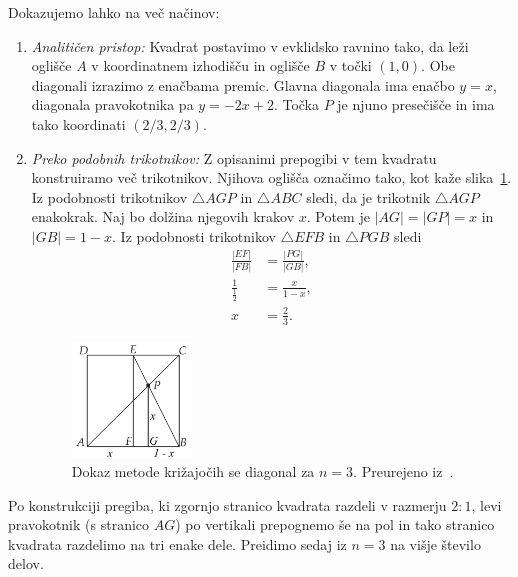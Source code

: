 \begin{dokaz}
    Dokazujemo lahko na več načinov:
    \begin{enumerate}
        \item \textit{Analitičen pristop:} Kvadrat postavimo v evklidsko ravnino tako, da leži oglišče $A$ v koordinatnem izhodišču in oglišče $B$ v točki $(1, 0)$. Obe diagonali izrazimo z enačbama premic. Glavna diagonala ima enačbo $y = x$, diagonala pravokotnika pa $y = -2x + 2$. Točka $P$ je njuno presečišče in ima tako koordinati $(2/3, 2/3)$.
        \item \textit{Preko podobnih trikotnikov:} Z opisanimi prepogibi v tem kvadratu konstruiramo več trikotnikov. Njihova oglišča označimo tako, kot kaže slika~\ref{fig:kriz_diag_3_dokaz}. Iz podobnosti trikotnikov $\triangle AGP$ in $\triangle ABC$ sledi, da je trikotnik $\triangle AGP$ enakokrak. Naj bo dolžina njegovih krakov $x$. Potem je $|AG| = |GP| = x$ in $|GB| = 1 - x$. Iz podobnosti trikotnikov $\triangle EFB$ in $\triangle PGB$ sledi
        \begin{align*}
            \frac{|EF|}{|FB|} &= \frac{|PG|}{|GB|}, \\
            \frac{1}{\frac{1}{2}} &= \frac{x}{1 - x}, \\
            x &= \frac{2}{3}.
        \end{align*}
        \begin{figure}[h]
            \centering
            \includegraphics[width=0.3\textwidth]{images/tretjinjenje_stranice2.png}
            \caption[Dokaz metode križajočih diagonal]{Dokaz metode križajočih se diagonal za $n=3$. Preurejeno iz~\cite[str. 38]{hull2013}.}
            \label{fig:kriz_diag_3_dokaz}
        \end{figure}
    \end{enumerate}
\end{dokaz}

Po konstrukciji pregiba, ki zgornjo stranico kvadrata razdeli v razmerju $2:1$, levi pravokotnik (s stranico $AG$) po vertikali prepognemo še na pol in tako stranico kvadrata razdelimo na tri enake dele. Preidimo sedaj iz $n = 3$ na višje število delov.

